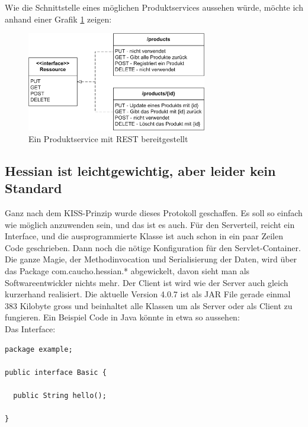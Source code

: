 \documentclass[abstracton, listof=totocnumbered,
bibliography=totocnumbered]{scrreprt}
\begin{document}
  Wie die Schnittstelle eines möglichen Produktservices aussehen würde, möchte
  ich anhand einer Grafik \ref{restPrinzip} zeigen:
  
  \begin{figure}[h]
      \begin{center}
          \includegraphics[width=0.7\textwidth]{./image/rest.png}
          \caption{Ein Produktservice mit REST bereitgestellt}
          \label{restPrinzip}
      \end{center}
  \end{figure}
  
  \subsection{Hessian ist leichtgewichtig, aber leider kein Standard}
  
  Ganz nach dem KISS-Prinzip\cite{KISS} wurde dieses Protokoll geschaffen. Es
  soll so einfach wie möglich anzuwenden sein, und das ist es auch. Für den
  Serverteil, reicht ein Interface, und die ausprogrammierte Klasse ist auch
  schon in ein paar Zeilen Code geschrieben. Dann noch die nötige Konfiguration
  für den Servlet-Container. Die ganze Magie, der Methodinvocation und
  Serialisierung der Daten, wird über das Package com.caucho.hessian.*
  abgewickelt, davon sieht man als Softwareentwickler nichts mehr. Der Client
  ist wird wie der Server auch gleich kurzerhand realisiert. Die aktuelle
  Version 4.0.7 ist als JAR File gerade einmal 383 Kilobyte gross und
  beinhaltet alle Klassen um als Server oder als Client zu fungieren. Ein
  Beispiel Code in Java könnte in etwa so aussehen:\\

  Das Interface:
  
\begin{verbatim}
package example;  

public interface Basic {

  public String hello();
  
}
\end{verbatim}
\end{document}
